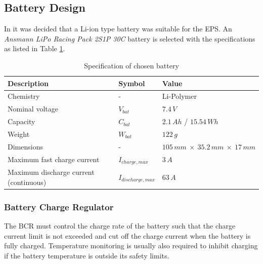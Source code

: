 \subsection{Battery Design}
In \cite{PDR} it was decided that a Li-ion type battery was suitable for the \ac{EPS}. An \textit{Ansmann \ac{LiPo} Racing Pack 2S1P 30C} battery is selected with the specifications as listed in Table \ref{tab:proposed_battery}.
%
\begin{table}[H]
\centering
\caption{Specification of chosen battery}
\label{tab:proposed_battery}
\begin{tabular}{p{}p{}p{}}
\hline
\textbf{Description} & \textbf{Symbol} & \textbf{Value}\\
\hline 
Chemistry & - & Li-Polymer\\
Nominal voltage & $V_{bat}$ & $7.4\,V$\\
Capacity & $C_{bat}$ & $2.1\,Ah$ / $15.54\,Wh$\\
Weight & $W_{bat}$ & $122\,g$\\
Dimensions & - & $105\,mm\:\times\:35.2\,mm\:\times\:17\,mm$\\
Maximum fast charge current & $I_{charge,max}$ & $3\,A$\\
Maximum discharge current (continuous) & $I_{discharge,max}$ & $63\,A$\\
\hline
\end{tabular}
\end{table}
%
%
\subsubsection{Battery Charge Regulator}
\label{subsec:BCR}
%
The \ac{BCR} must control the charge rate of the battery such that the charge current limit is not exceeded and cut off the charge current when the battery is fully charged. Temperature monitoring is usually also required to inhibit charging if the battery temperature is outside its safety limits. 

\pagebreak


